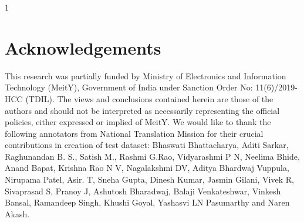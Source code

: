 \documentclass[runningheads]{llncs}
\def\arxiv{1}
\begin{document}
\if\arxiv1
\section{Acknowledgements}
This research was partially funded by Ministry of
Electronics and Information Technology (MeitY),
Government of India under Sanction Order No:
11(6)/2019-HCC (TDIL). The views and conclusions contained herein are those of the authors and
should not be interpreted as necessarily representing the official policies, either expressed or implied
of MeitY.
We would like to thank the following annotators
from National Translation Mission for their crucial
contributions in creation of test dataset: Bhaswati
Bhattacharya, Aditi Sarkar, Raghunandan B. S.,
Satish M., Rashmi G.Rao, Vidyarashmi P N, Neelima Bhide, Anand Bapat, Krishna
Rao N V, Nagalakshmi DV, Aditya Bhardwaj Vuppula, Nirupama Patel, Asir. T, Sneha Gupta, Dinesh Kumar, Jasmin Gilani, Vivek R, Sivaprasad S, Pranoy J, Ashutosh Bharadwaj, Balaji Venkateshwar, Vinkesh Bansal, Ramandeep Singh, Khushi Goyal, Yashasvi LN Pasumarthy and Naren Akash.
\fi





\end{document}
